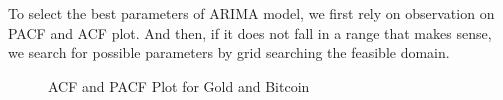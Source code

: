 \documentclass[12pt,a4paper]{article}
\begin{document}
\begin{spacing}{1.2}
To select the best parameters of ARIMA model, we first rely on observation on PACF and ACF plot. And then, if it does not fall in a range that makes sense, we search for possible parameters by grid searching the feasible domain.

\begin{figure}[htp]
	\begin{center}
		\caption{ACF and PACF Plot for Gold and Bitcoin}
		\label{fig:acf_pacf}
	\end{center}
\end{figure}


\end{spacing}
\end{document}
